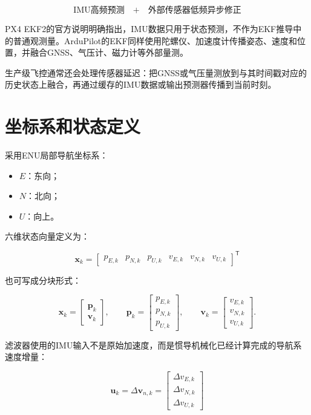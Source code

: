 \documentclass[12pt,a4paper]{ctexart}
\newcommand{\transpose}{^{\mathsf T}}
\begin{document}
\[
\boxed{
\text{IMU高频预测}
\quad+\quad
\text{外部传感器低频异步修正}
}
\]

PX4 EKF2的官方说明明确指出，IMU数据只用于状态预测，不作为EKF推导中的普通观测量。ArduPilot的EKF同样使用陀螺仪、加速度计传播姿态、速度和位置，并融合GNSS、气压计、磁力计等外部量测。

生产级飞控通常还会处理传感器延迟：把GNSS或气压量测放到与其时间戳对应的历史状态上融合，再通过缓存的IMU数据或输出预测器传播到当前时刻。

\section{坐标系和状态定义}

采用ENU局部导航坐标系：

\begin{itemize}[leftmargin=2em]
  \item $E$：东向；
  \item $N$：北向；
  \item $U$：向上。
\end{itemize}

六维状态向量定义为：

\[
\boxed{
\mathbf x_k =
\begin{bmatrix}
p_{E,k} &
p_{N,k} &
p_{U,k} &
v_{E,k} &
v_{N,k} &
v_{U,k}
\end{bmatrix}\transpose
}
\]

也可写成分块形式：

\[
\mathbf x_k =
\begin{bmatrix}
\mathbf p_k\\
\mathbf v_k
\end{bmatrix},
\qquad
\mathbf p_k =
\begin{bmatrix}
p_{E,k}\\p_{N,k}\\p_{U,k}
\end{bmatrix},
\qquad
\mathbf v_k =
\begin{bmatrix}
v_{E,k}\\v_{N,k}\\v_{U,k}
\end{bmatrix}.
\]

滤波器使用的IMU输入不是原始加速度，而是惯导机械化已经计算完成的导航系速度增量：

\[
\boxed{
\mathbf u_k =
\Delta \mathbf v_{n,k} =
\begin{bmatrix}
\Delta v_{E,k}\\
\Delta v_{N,k}\\
\Delta v_{U,k}
\end{bmatrix}
}
\]
\end{document}
